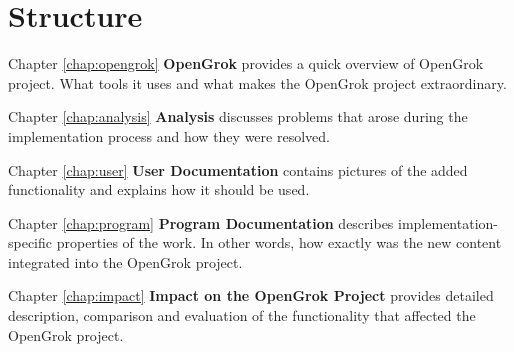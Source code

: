 \section{Structure}

Chapter \ref{chap:opengrok} \textbf{OpenGrok} provides a quick overview of OpenGrok project. What tools it uses and what
makes the OpenGrok project extraordinary.

Chapter \ref{chap:analysis} \textbf{Analysis} discusses problems that arose during the implementation process and how
they were resolved.

Chapter \ref{chap:user} \textbf{User Documentation} contains pictures of the added functionality and explains how it
should be used.

Chapter \ref{chap:program} \textbf{Program Documentation} describes implementation-specific properties of the work.
In other words, how exactly was the new content integrated into the OpenGrok project.

Chapter \ref{chap:impact} \textbf{Impact on the OpenGrok Project} provides detailed description, comparison and
evaluation of the functionality that affected the OpenGrok project.

